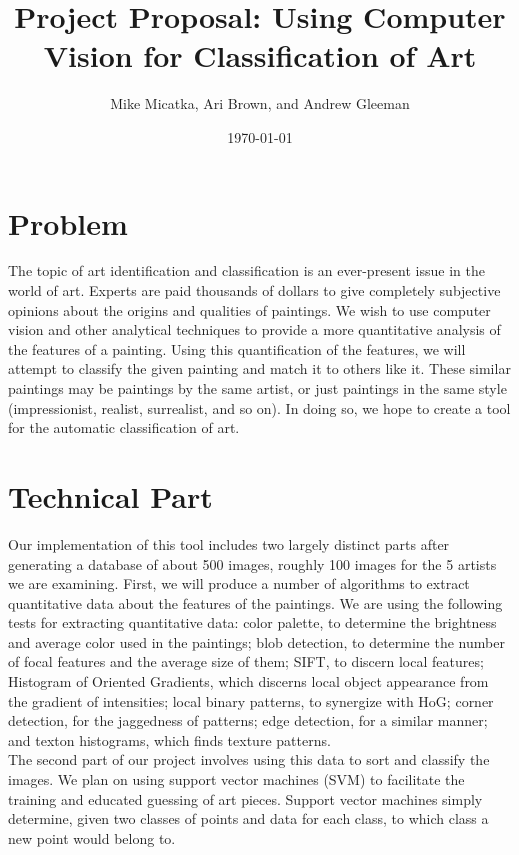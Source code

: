 \documentclass{article}
\title{Project Proposal: Using Computer Vision for Classification of Art}
\date{\today}
\author{Mike Micatka, Ari Brown, and Andrew Gleeman}
\begin{document}
\maketitle

\section{Problem}
The topic of art identification and classification is an ever-present issue in
the world of art. Experts are paid thousands of dollars to give completely
subjective opinions about the origins and qualities of paintings. We wish to
use computer vision and other analytical techniques to provide a more
quantitative analysis of the features of a painting. Using this quantification
of the features, we will attempt to classify the given painting and match it
to others like it. These similar paintings may be paintings by the same artist,
or just paintings in the same style (impressionist, realist, surrealist, and
so on). In doing so, we hope to create a tool for the automatic classification
of art.

\section{Technical Part}
Our implementation of this tool includes two largely distinct parts after
generating a database of about 500 images, roughly 100 images for the 5
artists we are examining. First, we will produce a number of algorithms
to extract quantitative data about the features of the paintings. We are
using the following tests for extracting quantitative data: color palette,
to determine the brightness and average color used in the paintings;
blob detection, to determine the number of focal features and the average
size of them; SIFT, to discern local features; Histogram of Oriented Gradients,
which discerns local object appearance from the gradient of intensities;
local binary patterns, to synergize with HoG; corner detection, for the
jaggedness of patterns; edge detection, for a similar manner; and texton
histograms, which finds texture patterns. \\

The second part of our project involves using this data to sort and classify
the images. We plan on using support vector machines (SVM) to facilitate the
training and educated guessing of art pieces. Support vector machines simply
determine, given two classes of points and data for each class, to which class
a new point would belong to. \\
\end{document}
